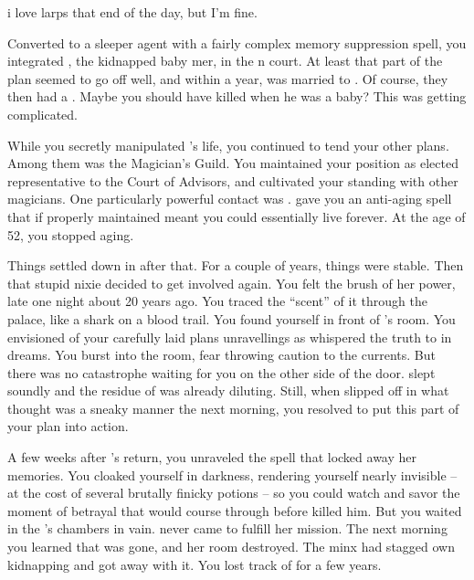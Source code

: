 i love larps that end of the day, but I'm fine.\documentclass[char]{NeptuneBall}
\begin{document}
Converted to a sleeper agent with a fairly complex memory suppression spell, you integrated \cQueen{}, the kidnapped baby mer\cQueen{\kid}, in the \pAtlantis{}n court. At least that part of the plan seemed to go off well, and within a year, \cKing{} was married to \cQueen{}. Of course, they then had a \cAriel{\offspring}. Maybe you should have killed \cKing{} when he was a baby? This was getting complicated.

While you secretly manipulated \cKing{\King} \cKing{}'s life, you continued to tend your other plans. Among them was the Magician's Guild. You maintained your position as elected representative to the Court of Advisors, and cultivated your standing with other magicians. One particularly powerful contact was \cWitch{}. \cWitch{\They} gave you an anti-aging spell that if properly maintained meant you could essentially live forever. At the age of 52, you stopped aging.

Things settled down in \pAtlantis{} after that. For a couple of years, things were stable. Then that stupid nixie decided to get involved again. You felt the brush of her power, late one night about 20 years ago. You traced the ``scent'' of it through the palace, like a shark on a blood trail. You found yourself in front of \cQueen{}'s room. You envisioned of your carefully laid plans unravellings as \cNixie{} whispered the truth to \cQueen{} in dreams. You burst into the room, fear throwing caution to the currents. But there was no catastrophe waiting for you on the other side of the door. \cQueen{} slept soundly and the residue of \cNixie{} was already diluting. Still, when \cQueen{} slipped off in what \cQueen{\they} thought was a sneaky manner the next morning, you resolved to put this part of your plan into action.

A few weeks after \cQueen{}'s return, you unraveled the spell that locked away her memories. You cloaked yourself in darkness, rendering yourself nearly invisible -- at the cost of several brutally finicky potions -- so you could watch and savor the moment of betrayal that would course through \cKing{} before \cQueen{} killed him. But you waited in the \cKing{\King}'s chambers in vain. \cQueen{} never came to fulfill her mission. The next morning you learned that \cQueen{\they} was gone, and her room destroyed. The minx had stagged \cQueen{\them} own kidnapping and got away with it. You lost track of \cQueen{\them} for a few years.
\end{document}
